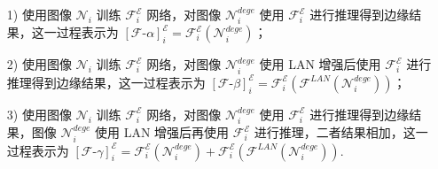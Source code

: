 \documentclass[a4paper]{ctexart}
\begin{document}
	\begin{itemize}
		\item[1)]
		使用图像 $\mathcal{N}_{i}$ 训练 $\mathcal{F}_{i}^{\mathcal{E}}$ 网络，对图像 $\mathcal{N}_{i}^{dege}$ 使用 $\mathcal{F}_{i}^{\mathcal{E}}$ 进行推理得到边缘结果，这一过程表示为 ${\left[\mathcal{F}\text{-}\alpha\right]}^{\mathcal{E}}_i = {\mathcal{F}}^\mathcal{E}_{i} (\mathcal{N}_{i}^{dege})$；
		
		\item[2)]
		使用图像 $\mathcal{N}_{i}$ 训练 $\mathcal{F}_{i}^{\mathcal{E}}$ 网络，对图像 $\mathcal{N}_{i}^{dege}$ 使用 LAN 增强后使用 $\mathcal{F}_{i}^{\mathcal{E}}$ 进行推理得到边缘结果，这一过程表示为 ${\left[\mathcal{F}\text{-}\beta\right]}^{\mathcal{E}}_i =  \mathcal{F}_{i}^{\mathcal{E}} \left(\mathcal{F}^{LAN} (\mathcal{N}_{i}^{dege})\right)$；
		
		\item[3)]
		使用图像 $\mathcal{N}_{i}$ 训练 $\mathcal{F}_{i}^{\mathcal{E}}$ 网络，对图像 $\mathcal{N}_{i}^{dege}$ 使用 $\mathcal{F}_{i}^{\mathcal{E}}$ 进行推理得到边缘结果，图像 $\mathcal{N}_{i}^{dege}$ 使用 LAN 增强后再使用 $\mathcal{F}_{i}^{\mathcal{E}}$ 进行推理，二者结果相加，这一过程表示为 ${\left[\mathcal{F}\text{-}\gamma\right]}^{\mathcal{E}}_i = \mathcal{F}_{i}^{\mathcal{E}} (\mathcal{N}_{i}^{dege}) + \mathcal{F}_{i}^{\mathcal{E}} \left(\mathcal{F}^{LAN} (\mathcal{N}_{i}^{dege})\right)$.
	\end{itemize}
	
\end{document}
